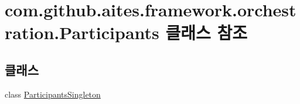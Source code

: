 \hypertarget{classcom_1_1github_1_1aites_1_1framework_1_1orchestration_1_1_participants}{}\section{com.\+github.\+aites.\+framework.\+orchestration.\+Participants 클래스 참조}
\label{classcom_1_1github_1_1aites_1_1framework_1_1orchestration_1_1_participants}
\subsection*{클래스}
\begin{DoxyCompactItemize}
\item 
class \mbox{\hyperlink{classcom_1_1github_1_1aites_1_1framework_1_1orchestration_1_1_participants_1_1_participants_singleton}{Participants\+Singleton}}
\end{DoxyCompactItemize}
